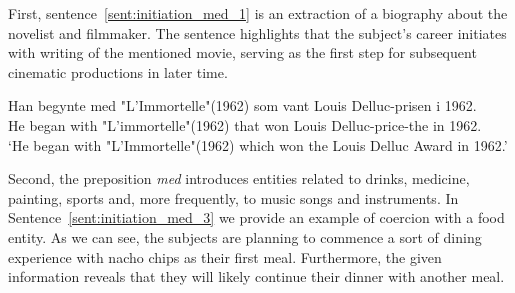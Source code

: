 \documentclass{article}
\begin{document}
First, sentence~\ref{sent:initiation_med_1} is an extraction of a biography about the novelist and filmmaker. The sentence highlights that the subject's career initiates with writing of the mentioned movie, serving as the first step for subsequent cinematic productions in later time.

        \ea \label{sent:initiation_med_1} %

        \gll Han begynte med "L'Immortelle"(1962) som vant Louis Delluc-prisen i 1962.\\
             He began with "L'immortelle"(1962) that won Louis Delluc-price-the in 1962.\\
        \glt ‘He began with "L'Immortelle"(1962) which won the Louis Delluc Award in 1962.’
        \z

        
\noindent Second, the preposition \emph{med} introduces entities related to drinks, medicine, painting, sports and, more frequently, to music songs and instruments. In Sentence~\ref{sent:initiation_med_3} we provide an example of coercion with a food entity. As we can see, the subjects are planning to commence a sort of dining experience with nacho chips as their first meal. Furthermore, the given information  reveals that they will likely continue their dinner with another meal. 
\end{document}
